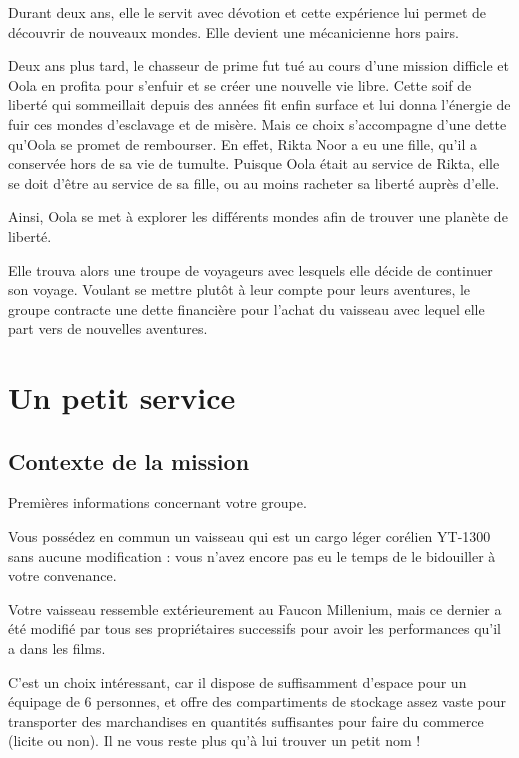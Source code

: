 \documentclass[a4paper,9pt,twoside,twocolumn,openany]{book}
\begin{document}
Durant deux ans, elle le servit avec dévotion et cette expérience lui permet de découvrir de nouveaux mondes. Elle devient une mécanicienne hors pairs.

Deux ans plus tard, le chasseur de prime fut tué au cours d’une mission difficle et Oola en profita pour s’enfuir et se créer une nouvelle vie libre. Cette soif de liberté qui sommeillait depuis des années fit enfin surface et lui donna l’énergie de fuir ces mondes d’esclavage et de misère. Mais ce choix s’accompagne d’une dette qu’Oola se promet de rembourser. En effet, Rikta Noor a eu une fille, qu’il a conservée hors de sa vie de tumulte. Puisque Oola était au service de Rikta, elle se doit d’être au service de sa fille, ou au moins racheter sa liberté auprès d’elle.

Ainsi, Oola se met à explorer les différents mondes afin de trouver une planète de liberté.

Elle trouva alors une troupe de voyageurs avec lesquels elle décide de continuer son voyage. Voulant se mettre plutôt à leur compte pour leurs aventures, le groupe contracte une dette financière pour l’achat du vaisseau avec lequel elle part vers de nouvelles aventures.

\chapter{Un petit service}

\section{Contexte de la mission}

Premières informations concernant votre groupe.

Vous possédez en commun un vaisseau qui est un cargo léger corélien YT-1300 sans aucune modification : vous n’avez encore pas eu le temps de le bidouiller à votre convenance.

\begin{quotebox}
Votre vaisseau ressemble extérieurement au Faucon Millenium, mais ce dernier a été modifié par tous ses propriétaires successifs pour avoir les performances qu’il a dans les films.
\end{quotebox}

C’est un choix intéressant, car il dispose de suffisamment d’espace pour un équipage de 6 personnes, et offre des compartiments de stockage assez vaste pour transporter des marchandises en quantités suffisantes pour faire du commerce (licite ou non). Il ne vous reste plus qu’à lui trouver un petit nom !
\end{document}
